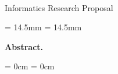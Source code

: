 \thispagestyle{plain}

\begin{center}
  \Huge
  \textbf{\@title}\\
  \vspace{.5em}
  \normalsize
  Informatics Research Proposal\\
  \@author
  \vspace{.4em}
\end{center}

\newcommand{\abstractmargin}{14.5mm}

\leftskip  = \abstractmargin
\rightskip = \abstractmargin

\footnotesize
\noindent
\textbf{Abstract.}


\leftskip  = 0cm
\rightskip = 0cm
\vspace{.5em}
